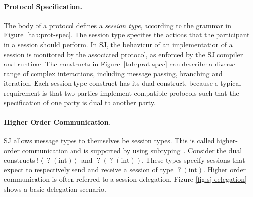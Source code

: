 \documentclass[10pt]{llncs}
\begin{document}
\paragraph{Protocol Specification.}

The body of a protocol defines a \textit{session type}, according to the grammar in Figure~\ref{tab:prot-spec}.
The session type specifies the actions that the participant in a session should perform. In SJ, the behaviour of an implementation of a session is monitored by the associated protocol, as enforced by the SJ compiler and runtime. %
The constructs in Figure~\ref{tab:prot-spec} can describe a diverse range of complex interactions, including message passing, branching and iteration. Each session type construct has its dual construct, because a typical requirement is that two parties implement compatible protocols such that the specification of one party is dual to another party.



\paragraph{Higher Order Communication.}

SJ allows message types to themselves be session types. This is called higher-order communication and is supported by using subtyping~\cite{higher-order-comm}.
Consider the dual constructs $\mathopen{!}\left<\mathopen{?}\left(\text{int}\right)\right>$ and $\mathopen{?}\left(\mathopen{?}\left(\text{int}\right)\right)$. 
These types specify sessions that expect to respectively send and receive a session of type $\mathopen{?}\left(\text{int}\right)$.
Higher order communication is often referred to a session delegation. Figure \ref{fig:sj-delegation} shows a basic delegation scenario.
\end{document}
